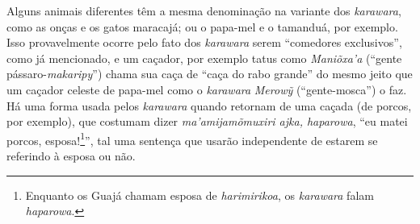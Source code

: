 


Alguns animais diferentes têm a mesma denominação na variante dos
\emph{karawara}, como as onças e os gatos maracajá; ou o papa-mel e o
tamanduá, por exemplo. Isso provavelmente ocorre pelo fato dos
\emph{karawara} serem ``comedores exclusivos'', como já mencionado, e um
caçador, por exemplo tatus como \emph{Maniõxa'a} (``gente
pássaro-\emph{makaripy}'') chama sua caça de ``caça do rabo grande'' do
mesmo jeito que um caçador celeste de papa-mel como o \emph{karawara}
\emph{Merowỹ} (``gente-mosca'') o faz. Há uma forma usada pelos
\emph{karawara} quando retornam de uma caçada (de porcos, por exemplo),
que costumam dizer \emph{ma'amijamõmuxiri ajka, haparowa}, ``eu matei
porcos, esposa!\footnote{Enquanto os Guajá chamam esposa de
  \emph{harimirikoa}, os \emph{karawara} falam \emph{haparowa}.}'', tal
uma sentença que usarão independente de estarem se referindo à esposa ou
não.

